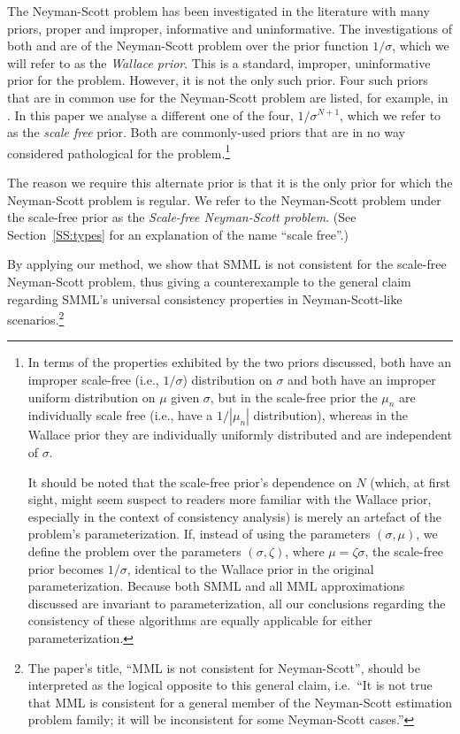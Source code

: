 \documentclass{IEEEtran}
\newcommand{\citet}[1]{\cite{#1}}
\begin{document}
The Neyman-Scott problem has been
investigated in the literature with many priors, proper and improper,
informative and uninformative.
The investigations of both  \citet{dowe1997resolving} and \citet{Wallace2005}
are of the Neyman-Scott problem over the prior function $1/\sigma$,
which we will refer to as the \emph{Wallace prior}.
This is a standard, improper, uninformative prior for the problem. However,
it is not the only such prior.
Four such priors that are in common use for the Neyman-Scott problem are
listed, for example, in \citet{yang1996catalog}. In this paper we analyse a
different one of the four, $1/\sigma^{N+1}$, which we refer to as the
\emph{scale free} prior.
Both are commonly-used priors that are in no way considered pathological
for the problem.\footnote{In terms of the properties exhibited by the two
priors discussed,
both have an improper scale-free (i.e., $1/\sigma$) distribution on $\sigma$ and
both have an improper uniform distribution on $\mu$ given $\sigma$, but in
the scale-free prior the $\mu_n$ are individually scale free (i.e., have a
$1/|\mu_n|$ distribution), whereas in the Wallace prior they are individually
uniformly distributed and are independent of $\sigma$.

It should be noted that the scale-free prior's dependence on $N$ (which,
at first sight, might seem suspect to readers more familiar with the
Wallace prior, especially in the context of consistency analysis) is
merely an artefact of the problem's parameterization.
If, instead of using the parameters $(\sigma,\mu)$,
we define the problem over the parameters $(\sigma,\zeta)$, where
$\mu=\zeta\sigma$,
the scale-free prior becomes $1/\sigma$,
identical to the Wallace prior in the original parameterization. Because both
SMML and all MML approximations discussed are invariant to
parameterization, all our conclusions regarding the consistency of these
algorithms are equally applicable for either parameterization.}

The reason we require this alternate prior is that it is the only prior for
which the Neyman-Scott problem is regular. We refer to the
Neyman-Scott problem under the scale-free prior as the
\emph{Scale-free Neyman-Scott problem}. (See Section~\ref{SS:types} for an
explanation of the name ``scale free''.)

By applying our method, we show that SMML is not consistent
for the scale-free Neyman-Scott problem, thus giving a
counterexample to the general claim regarding SMML's universal
consistency properties in Neyman-Scott-like scenarios.\footnote{The
paper's title, ``MML is not consistent for Neyman-Scott'',
should be interpreted as the logical opposite to this general claim,
i.e.\ ``It is not true
that MML is consistent for a general member of the Neyman-Scott estimation
problem family; it will be inconsistent for some Neyman-Scott cases.''}
\end{document}
